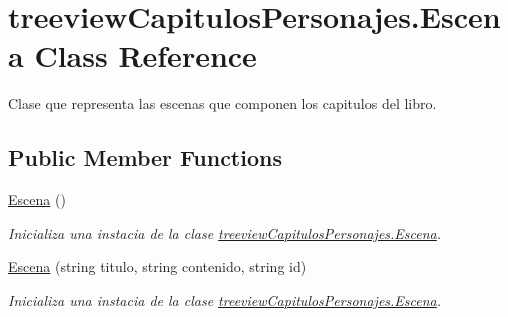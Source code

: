 \hypertarget{classtreeview_capitulos_personajes_1_1_escena}{\section{treeview\-Capitulos\-Personajes.\-Escena Class Reference}
\label{classtreeview_capitulos_personajes_1_1_escena}
}


Clase que representa las escenas que componen los capitulos del libro.  


\subsection*{Public Member Functions}
\begin{DoxyCompactItemize}
\item 
\hyperlink{classtreeview_capitulos_personajes_1_1_escena_ac660c90c0024aa27d125f5460716a7ab}{Escena} ()
\begin{DoxyCompactList}\small\item\em Inicializa una instacia de la clase \hyperlink{classtreeview_capitulos_personajes_1_1_escena}{treeview\-Capitulos\-Personajes.\-Escena}. \end{DoxyCompactList}\item 
\hyperlink{classtreeview_capitulos_personajes_1_1_escena_a0f5372c6154975b3b1f9824635e1a5f3}{Escena} (string titulo, string contenido, string id)
\begin{DoxyCompactList}\small\item\em Inicializa una instacia de la clase \hyperlink{classtreeview_capitulos_personajes_1_1_escena}{treeview\-Capitulos\-Personajes.\-Escena}. \end{DoxyCompactList}\end{DoxyCompactItemize}
